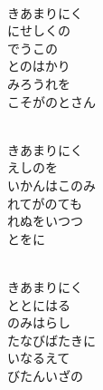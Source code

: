 \documentclass[10pt,b5j]{tarticle} %
\begin{document}
\vspace{1.5em} %
\newcommand{\linespace}{0.5em} %
\newcommand{\blocksize}{0.5\hsize} %
\newcommand{\itemmargin}{3em} %
\begin{enumerate} %
    \setlength{\itemindent}{\itemmargin} %
    \begin{minipage}[c]{\blocksize}
    
        \vspace{\linespace}
        \item~\\
        きあまりにく\\
        にせしくの\\
        でうこの\\
        とのはかり\\
        みろうれを\\
        こそがのとさん
        
    \end{minipage}
    \begin{minipage}[c]{\blocksize}
        
        \vspace{\linespace}
        \item~\\
        きあまりにく\\
        えしのを\\
        いかんはこのみ\\
        れてがのても\\
        れぬをいつつ\\
        とをに
        
    \end{minipage}
    \begin{minipage}[c]{\blocksize}
        
        \vspace{\linespace}
        \item~\\
        きあまりにく\\
        ととにはる\\
        のみはらし\\
        たなびばたきに\\
        いなるえて\\
        びたんいざの
    

\end{minipage}
\end{enumerate}
\end{document}
